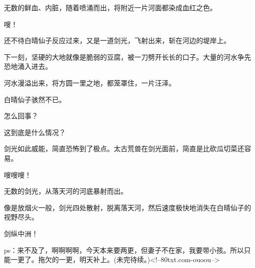 \begin{this_body}
无数的鲜血、内脏，随着喷涌而出，将附近一片河面都染成血红之色。

嗖！

还不待白晴仙子反应过来，又是一道剑光，飞射出来，斩在河边的堤岸上。

下一刻，坚硬的大地就像是脆弱的豆腐，被一刀劈开长长的口子。大量的河水争先恐地涌入进去。

河水漫溢出来，将方圆一里之地，都笼罩住，一片汪泽。

白晴仙子骇然不已。

怎么回事？

这到底是什么情况？

剑光如此威能，简直恐怖到了极点。太古荒兽在剑光面前，简直是比砍瓜切菜还容易。

嗖嗖嗖！

无数的剑光，从落天河的河底暴射而出。

像是放烟火一般，剑光四处散射，脱离落天河，然后速度极快地消失在白晴仙子的视野尽头。

剑纵中洲！

ps：来不及了，啊啊啊啊，今天本来要两更，但妻子不在家，我要带小孩。所以只能一更了。拖欠的一更，明天补上。(未完待续。)<!--80txt.com-ouoou-->

\end{this_body}

